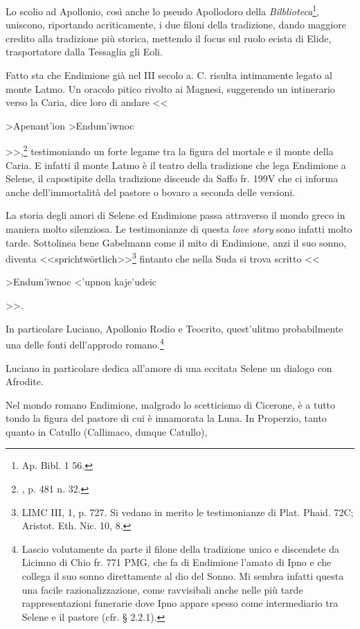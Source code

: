 \documentclass[12pt,a4paper,openright, oneside]{book}
\begin{document}
Lo scolio ad Apollonio, così anche lo pseudo Apollodoro della \textit{Bilblioteca}\footnote{Ap. Bibl. 1 56. \nocite{Wagner}}, uniscono, riportando acriticamente, i due filoni della tradizione, dando maggiore credito alla tradizione più storica, mettendo il focus sul ruolo ecista di Elide, trasportatore dalla Tessaglia gli Eoli. 

Fatto sta che Endimione già nel III secolo a. C. risulta intimamente legato al monte Latmo. Un oracolo pitico rivolto ai Magnesi, suggerendo un intinerario verso la Caria, dice loro di andare <<\begin{otherlanguage}{greek}>Apenant'ion >Endum'iwnoc\end{otherlanguage}>>,\footnote{\cite{Robert}, p. 481 n. 32.} testimoniando un forte legame tra la figura del mortale e il monte della Caria. E infatti il monte Latmo è il teatro della tradizione che lega Endimione a Selene, il capostipite della tradizione discende da Saffo fr. 199V che ci informa anche dell'immortalità del pastore o bovaro a seconda delle versioni. 

La storia degli amori di Selene ed Endimione passa attraverso il mondo greco in maniera molto silenziosa. Le testimonianze di questa \textit{love story} sono infatti molto tarde. Sottolinea bene Gabelmann come il mito di Endimione, anzi il suo sonno, diventa <<sprichtw\"ortlich>>\footnote{LIMC III, 1, p. 727. Si vedano in merito le testimonianze di Plat. Phaid. 72C; Aristot. Eth. Nic. 10, 8.} fintanto che nella Suda si trova scritto <<\begin{otherlanguage}{greek} >Endum'iwnoc <'upnon kaje'udeic \end{otherlanguage}>>.

In particolare Luciano, Apollonio Rodio e Teocrito, quest'ulitmo probabilmente una delle fonti dell'approdo romano.\footnote{Lascio volutamente da parte il filone della tradizione unico e discendete da Licimno di Chio fr. 771 PMG, che fa di Endimione l'amato di Ipno e che collega il suo sonno direttamente al dio del Sonno. Mi sembra infatti questa una facile razionalizzazione, come ravvisibali anche nelle più tarde rappresentazioni funerarie dove Ipno appare spesso come intermediario tra Selene e il pastore (cfr. § 2.2.1).}

Luciano in particolare dedica all'amore di una eccitata Selene un dialogo con Afrodite.

Nel mondo romano Endimione, malgrado lo scetticismo di Cicerone, è a tutto tondo la figura del pastore di cui è innamorata la Luna. In Properzio, tanto quanto in Catullo (Callimaco, dunque Catullo), 
\end{document}
